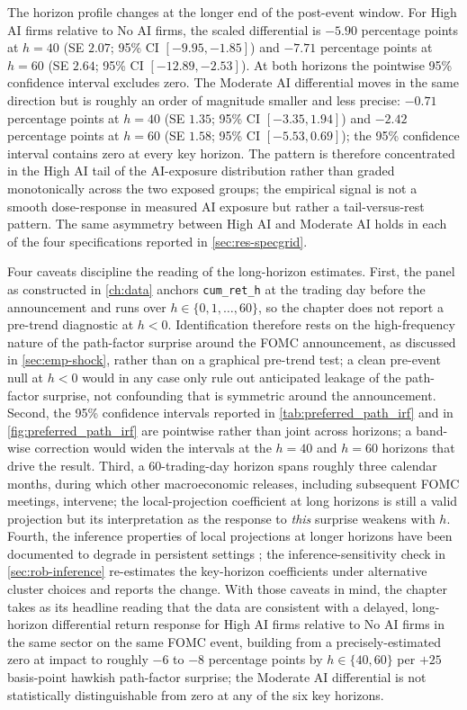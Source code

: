 The horizon profile changes at the longer end of the post-event window.
For High AI firms relative to No AI firms, the scaled differential is
$-5.90$ percentage points at $h = 40$ (SE $2.07$; 95\% CI $[-9.95, -1.85]$)
and $-7.71$ percentage points at $h = 60$ (SE $2.64$; 95\% CI
$[-12.89, -2.53]$). At both horizons the pointwise 95\% confidence
interval excludes zero. The Moderate AI differential moves in the same
direction but is roughly an order of magnitude smaller and less precise:
$-0.71$ percentage points at $h = 40$ (SE $1.35$; 95\% CI $[-3.35, 1.94]$)
and $-2.42$ percentage points at $h = 60$ (SE $1.58$; 95\% CI
$[-5.53, 0.69]$); the 95\% confidence interval contains zero at every key
horizon. The pattern is therefore concentrated in the High AI tail of the
AI-exposure distribution rather than graded monotonically across the two
exposed groups; the empirical signal is not a smooth dose-response in
measured AI exposure but rather a tail-versus-rest pattern. The same
asymmetry between High AI and Moderate AI holds in each of the four
specifications reported in \cref{sec:res-specgrid}.

Four caveats discipline the reading of the long-horizon estimates.
First, the panel as constructed in \cref{ch:data} anchors
\texttt{cum\_ret\_h} at the trading day before the announcement and runs
over $h \in \{0, 1, \dots, 60\}$, so the chapter does not report a
pre-trend diagnostic at $h < 0$. Identification therefore rests on the
high-frequency nature of the path-factor surprise around the FOMC
announcement, as discussed in \cref{sec:emp-shock}, rather than on a
graphical pre-trend test; a clean pre-event null at $h < 0$ would in any
case only rule out anticipated leakage of the path-factor surprise, not
confounding that is symmetric around the announcement. Second, the 95\%
confidence intervals reported in \cref{tab:preferred_path_irf} and in
\cref{fig:preferred_path_irf} are pointwise rather than joint across
horizons; a band-wise correction would widen the intervals at the
$h = 40$ and $h = 60$ horizons that drive the result. Third, a
60-trading-day horizon spans roughly three calendar months, during which
other macroeconomic releases, including subsequent FOMC meetings,
intervene; the local-projection coefficient at long horizons is still a
valid projection but its interpretation as the response to \emph{this}
surprise weakens with $h$. Fourth, the inference properties of local
projections at longer horizons have been documented to degrade in
persistent settings \citep{olea2024lp}; the inference-sensitivity check
in \cref{sec:rob-inference} re-estimates the key-horizon coefficients
under alternative cluster choices and reports the change. With those
caveats in mind, the chapter takes as its headline reading that the data
are consistent with a delayed, long-horizon differential return response
for High AI firms relative to No AI firms in the same sector on the same
FOMC event, building from a precisely-estimated zero at impact to roughly
$-6$ to $-8$ percentage points by $h \in \{40, 60\}$ per $+25$
basis-point hawkish path-factor surprise; the Moderate AI differential
is not statistically distinguishable from zero at any of the six key
horizons.

